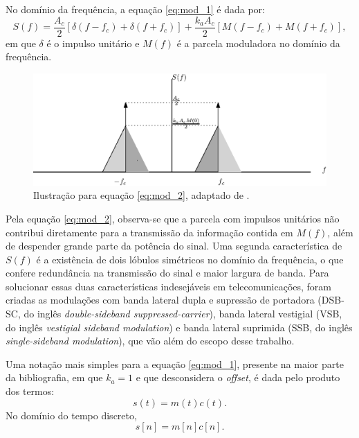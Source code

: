   No domínio da frequência, a equação \eqref{eq:mod_1} é dada por:
\begin{equation}
    S(f) = \frac{A_c}{2} [\delta (f - f_c) + \delta(f + f_c)] + \frac{k_a A_c}{2} [M(f - f_c) + M (f + f_c)], \label{eq:mod_2}
\end{equation}
em que $\delta$ é o impulso unitário e $M(f)$ é a parcela moduladora no domínio
da frequência.
\begin{figure}[H]
    \centering
    \includegraphics[scale=1]{chapters/chap01/images/mod.eps}
    \caption{Ilustração para equação \eqref{eq:mod_2}, adaptado de \cite{haykin2008}.}
\end{figure}

Pela equação \eqref{eq:mod_2}, observa-se que a parcela com impulsos unitários
não contribui diretamente para a transmissão da informação contida em $M(f)$,
além de despender grande parte da potência do sinal. Uma segunda característica
de $S(f)$ é a existência de dois lóbulos simétricos no domínio da
frequência, o que confere redundância na transmissão do sinal e maior largura de
banda. Para solucionar essas duas características indesejáveis em
telecomunicações, foram criadas as modulações com banda lateral dupla e
supressão de portadora (DSB-SC, do inglês \textit{double-sideband
suppressed-carrier}), banda lateral vestigial (VSB, do inglês \textit{vestigial
sideband modulation}) e banda lateral suprimida (SSB, do inglês
\textit{single-sideband modulation}), que vão além do escopo desse trabalho.


Uma notação mais simples para a equação \eqref{eq:mod_1}, presente na maior
parte da bibliografia, em que $k_a = 1$ e que desconsidera o \textit{offset}, é
dada pelo produto dos termos:
\begin{equation}
    s(t) = m(t)c(t). \label{eq:signal_eq}
\end{equation}
No domínio do tempo discreto,
\begin{equation}
    s[n] = m[n]c[n]. 
\end{equation}

